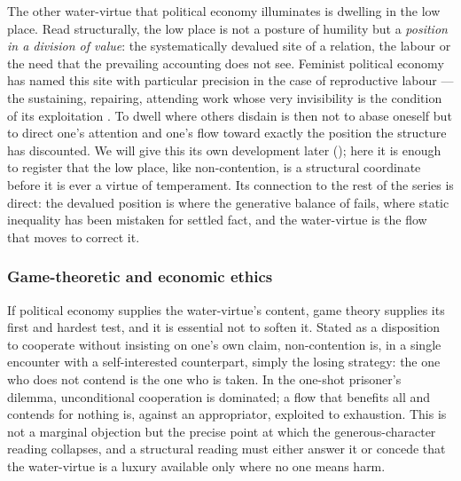 The other water-virtue that political economy illuminates is dwelling in the low place. Read structurally, the low place is not a posture of humility but a \emph{position in a division of value}: the systematically devalued site of a relation, the labour or the need that the prevailing accounting does not see. Feminist political economy has named this site with particular precision in the case of reproductive labour --- the sustaining, repairing, attending work whose very invisibility is the condition of its exploitation \parencite{federici2004}. To dwell where others disdain is then not to abase oneself but to direct one's attention and one's flow toward exactly the position the structure has discounted. We will give this its own development later (); here it is enough to register that the low place, like non-contention, is a structural coordinate before it is ever a virtue of temperament. Its connection to the rest of the series is direct: the devalued position is where the generative balance of \textcite{paperxvii} fails, where static inequality has been mistaken for settled fact, and the water-virtue is the flow that moves to correct it.

\subsubsection{Game-theoretic and economic ethics}
\label{p20:ssub:review-game}

If political economy supplies the water-virtue's content, game theory supplies its first and hardest test, and it is essential not to soften it. Stated as a disposition to cooperate without insisting on one's own claim, non-contention is, in a single encounter with a self-interested counterpart, simply the losing strategy: the one who does not contend is the one who is taken. In the one-shot prisoner's dilemma, unconditional cooperation is dominated; a flow that benefits all and contends for nothing is, against an appropriator, exploited to exhaustion. This is not a marginal objection but the precise point at which the generous-character reading collapses, and a structural reading must either answer it or concede that the water-virtue is a luxury available only where no one means harm.

